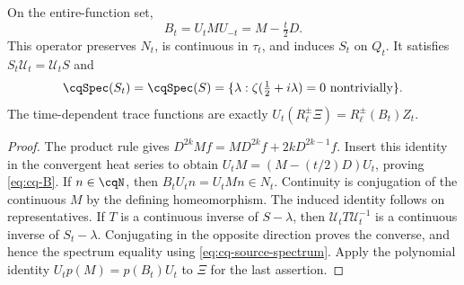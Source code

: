 \begin{cqtheorem}\label{thm:cq-moving}
On the entire-function set,
\begin{equation}\label{eq:cq-B}
 B_t=U_tMU_{-t}=M-\tfrac t2D.
\end{equation}
This operator preserves $N_t$, is continuous in $\tau_t$, and induces
$S_t$ on $Q_t$. It satisfies
$S_t\mathcal U_t=\mathcal U_tS$ and
\begin{equation}\label{eq:cq-specmove}
 \cqSpec(S_t)=\cqSpec(S)
 =\{\lambda:\zeta(\tfrac12+i\lambda)=0\text{ nontrivially}\}.
\end{equation}
The time-dependent trace functions are exactly
$U_t(R_\ell^\pm\Xi)=R_\ell^\pm(B_t)Z_t$.
\end{cqtheorem}
\begin{proof}
The product rule gives $D^{2k}Mf=MD^{2k}f+2kD^{2k-1}f$.
Insert this identity in the convergent heat series to obtain
$U_tM=(M-(t/2)D)U_t$, proving \eqref{eq:cq-B}.
If $n\in\cqN$, then $B_tU_tn=U_tMn\in N_t$.
Continuity is conjugation of the continuous $M$ by the defining
homeomorphism. The induced identity follows on representatives.
If $T$ is a continuous inverse of $S-\lambda$, then
$\mathcal U_tT\mathcal U_t^{-1}$ is a continuous inverse of
$S_t-\lambda$. Conjugating in the opposite direction proves the
converse, and hence the spectrum equality using
\eqref{eq:cq-source-spectrum}. Apply the polynomial identity
$U_tp(M)=p(B_t)U_t$ to $\Xi$ for the last assertion.
\end{proof}

